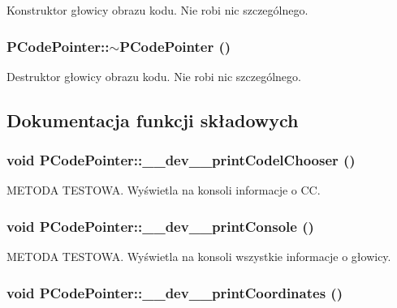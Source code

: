 Konstruktor głowicy obrazu kodu. Nie robi nic szczególnego. \hypertarget{classPCodePointer_dc12b4bda6ed4b1045b0767b41ff2efa}{
\subsubsection[{$\sim$PCodePointer}]{\setlength{\rightskip}{0pt plus 5cm}PCodePointer::$\sim$PCodePointer ()}}
\label{classPCodePointer_dc12b4bda6ed4b1045b0767b41ff2efa}


Destruktor głowicy obrazu kodu. Nie robi nic szczególnego. 

\subsection{Dokumentacja funkcji składowych}
\hypertarget{classPCodePointer_21810c2cdb66ea83cabafde33e8a0206}{
\subsubsection[{\_\-\_\-dev\_\-\_\-printCodelChooser}]{\setlength{\rightskip}{0pt plus 5cm}void PCodePointer::\_\-\_\-dev\_\-\_\-printCodelChooser ()}}
\label{classPCodePointer_21810c2cdb66ea83cabafde33e8a0206}


METODA TESTOWA. Wyświetla na konsoli informacje o CC. \hypertarget{classPCodePointer_fe765c0487ab59dbbbdd47b78842bbcb}{
\subsubsection[{\_\-\_\-dev\_\-\_\-printConsole}]{\setlength{\rightskip}{0pt plus 5cm}void PCodePointer::\_\-\_\-dev\_\-\_\-printConsole ()}}
\label{classPCodePointer_fe765c0487ab59dbbbdd47b78842bbcb}


METODA TESTOWA. Wyświetla na konsoli wszystkie informacje o głowicy. \hypertarget{classPCodePointer_ce0986ca3dc000a06a0155d20cd83d26}{
\subsubsection[{\_\-\_\-dev\_\-\_\-printCoordinates}]{\setlength{\rightskip}{0pt plus 5cm}void PCodePointer::\_\-\_\-dev\_\-\_\-printCoordinates ()}}
\label{classPCodePointer_ce0986ca3dc000a06a0155d20cd83d26}


